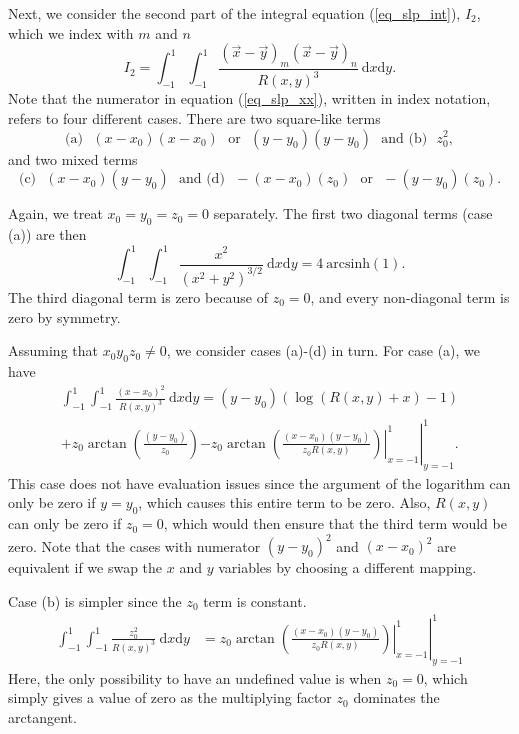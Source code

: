 Next, we consider the second part of the integral equation (\ref{eq_slp_int}), $I_2$, which we index with $m$ and $n$
\begin{equation}
I_2 = \int_{-1}^1  \int_{-1}^1  \frac{(\vec{x}-\vec{y})_m (\vec{x}-\vec{y})_n }{R(x,y)^3}
	\ \text{d}x \text{d}y
.
\label{eq_slp_xx}
\end{equation}
Note that the numerator in equation (\ref{eq_slp_xx}), written in index notation,  refers to four different cases. There are two square-like terms
\begin{equation*}
\text{(a)} ~~~	(x-x_0)(x-x_0) ~~~ \text{or} ~~~	(y-y_0)(y-y_0)
	  ~~~\text{and (b)} ~~~ 	z_0^2,
\end{equation*}
and two mixed terms
\begin{equation*}
\text{(c)} ~~~	(x-x_0)(y-y_0)
	 ~~~ 	\text{and (d)} ~~~-(x-x_0)(z_0)
	 ~~~ \text{or} ~~~	-(y-y_0)(z_0).
\end{equation*}

Again, we treat $x_0=y_0=z_0=0$ separately. The first two diagonal terms (case (a)) are then
\begin{equation}
	\int _{-1}^1\int _{-1}^1
	\frac{x^2}{\left(x^2+y^2\right)^{3/2}}
	\ \text{d}x \text{d}y
	=4 \ \text{arcsinh}(1).
\end{equation}
The third diagonal term is zero because of $z_0=0$, and every non-diagonal term is zero by symmetry.

Assuming that $x_0y_0z_0\neq0$,  we consider cases (a)-(d) in turn.
For case (a), we have
\begin{align}
\int_{-1}^1 \int_{-1}^1 \frac{(x-x_0)^2 }{R(x,y)^{3}}  \ \text{d}x \text{d}y
=(y-y_0) \left(\log \left(R(x,y)+x\right)-1\right) \nonumber \\ 
 +z_0  \arctan\left(\frac{(y-y_0)}{z_0}\right) \left. \left.
-z_0 \arctan\left(\frac{(x-x_0)(y-y_0)}{ z_0R(x,y)}\right) \right|_{x=-1}^1 \right|_{y=-1}^1 .
\label{eq_slp_int_xx}
\end{align}
This case does not have evaluation issues since the argument of the logarithm can only be zero if $y=y_0$, which causes this entire term to be zero. Also, $R(x,y)$ can only be zero if $z_0=0$, which would then ensure that the third term would be zero. 
Note that the cases with numerator $(y-y_0)^2$ and  $(x-x_0)^2$ are equivalent if we swap the $x$ and $y$ variables by choosing a different mapping.


Case (b) is simpler since the $z_0$ term is constant. 
\begin{align}
\int_{-1}^1 \int_{-1}^1 \frac{z_0^2 }{R(x,y)^{3}}  \ \text{d}x \text{d}y
&= \left. \left.
z_0  \arctan \left(\frac{(x-x_0) (y-y_0)}{z_0  R(x,y)  }\right) \right|_{x=-1}^1 \right|_{y=-1}^1 
\label{eq_slp_int_zz}
\end{align}
Here, the only possibility to have an undefined value is when $z_0=0$, which simply gives a value of zero as the multiplying factor $z_0$ dominates the arctangent.


